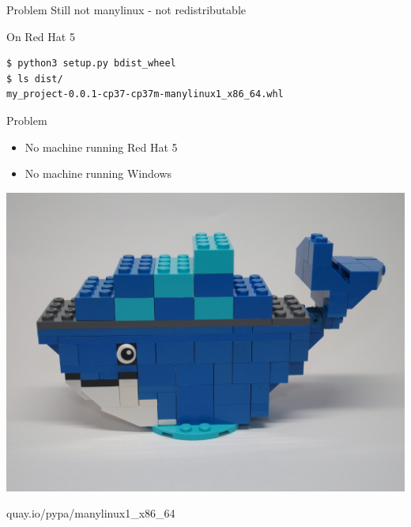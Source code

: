 \documentclass[pdf]{beamer}
\begin{document}
\begin{frame}
    \begin{block}{Problem}
        Still not manylinux - not redistributable
    \end{block}
\end{frame}

\begin{frame}[fragile]
    \begin{block}{On Red Hat 5}
        \begin{verbatim}
$ python3 setup.py bdist_wheel
$ ls dist/
my_project-0.0.1-cp37-cp37m-manylinux1_x86_64.whl
        \end{verbatim}
    \end{block}
\end{frame}

\begin{frame}
    \begin{block}{Problem}
        \begin{itemize}[<+->]
            \item No machine running Red Hat 5
            \item No machine running Windows
        \end{itemize}
    \end{block}
\end{frame}

\begin{frame}
    \begin{center}
        \includegraphics[height = 0.8\textheight]{img/docker.jpg}

        {\large quay.io/pypa/manylinux1{\_}x86{\_}64}
    \end{center}
\end{frame}
\end{document}
